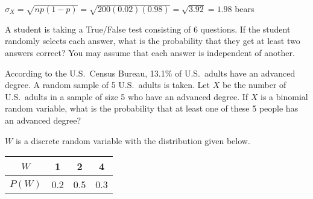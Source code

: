 \documentclass[noanswers]{exam}
\begin{document}
\begin{questions}
\begin{parts}
	\begin{solution}[\stretch{1}]
	
	\vspace{3mm}

	$\sigma_X=\sqrt{np(1-p)}=\sqrt{200(0.02)(0.98)}=\sqrt{3.92}=1.98$ bears
	
	\vspace{3mm}

	\end{solution}	
	
	\end{parts}
	
\newpage

\question A student is taking a True/False test consisting of 6 questions. If the student randomly selects each answer, what is the probability that they get at least two answers correct? You may assume that each answer is independent of another.

\vspace{3mm}

\begin{choices}
\end{choices}

\vspace{3mm}

\question According to the U.S.\ Census Bureau, 13.1\% of U.S.\ adults have an advanced degree. A random sample of 5 U.S.\ adults is taken. Let $X$ be the number of U.S.\ adults in a sample of size 5 who have an advanced degree. If $X$ is a binomial random variable, what is the probability that at least one of these 5 people has an advanced degree?

\vspace{3mm}

\begin{choices}
\end{choices}

\vspace{3mm}

\question $W$ is a discrete random variable with the distribution given below.

\begin{center}
\begin{tabular}{c|ccc}
$W$ & 1 & 2 & 4 \\
\hline
$P(W)$ & 0.2 & 0.5 & 0.3\\
\end{tabular}
\end{center}
\begin{parts}


\end{parts}
\end{questions}
\end{document}
